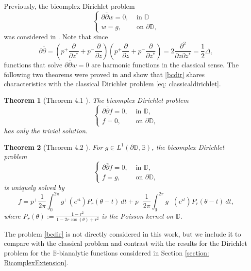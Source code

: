 \documentclass[12pt,reqno]{amsart}
\newtheorem{theorem}{Theorem}[section]
\theoremstyle{definition}
\theoremstyle{remark}
\newcommand{\p}{\partial}
\newcommand{\dbar}{\bar\partial}
\newcommand{\bc}{\mathbb{B}}
\newcommand{\disk}{\mathbb{D}}
\begin{document}
         Previously, the bicomplex Dirichlet problem 
         \begin{equation}\label{bcdir}\begin{cases}
                \p \dbar w = 0, & \text{ in }\disk\\
                w = g, & \text{ on } \p\disk,
         \end{cases}\end{equation}
         was considered in \cite{BCSchwarz}. Note that since 
         \[
            \p \dbar = \left(p^+ \frac{\p}{\p z^*} + p^- \frac{\p }{\p z} \right) \left(p^+ \frac{\p }{\p z} + p^- \frac{\p}{\p z^*}\right) = 2 \frac{\p^2}{\p z\p z^*} = \frac{1}{2}\Delta , 
         \]
         functions that solve $\p \dbar w = 0$ are harmonic functions in the classical sense. The following two theorems were proved in \cite{BCSchwarz} and show that \eqref{bcdir} shares characteristics with the classical Dirichlet problem \eqref{eq: classicaldirichlet}.
         
         \begin{theorem}[Theorem 4.1 \cite{BCSchwarz}]
             The bicomplex Dirichlet problem
            \[
                \begin{cases}
                  \p \dbar f = 0, &\text{ in } \disk,\\
                  f = 0, &\text{ on } \p\disk,
                \end{cases}
            \]
        has only the trivial solution.
        \end{theorem}

        \begin{theorem}[Theorem 4.2 \cite{BCSchwarz}]
            For $g \in L^1(\p \disk, \bc)$, the bicomplex Dirichlet problem
            \[
                \begin{cases}
                    \p \dbar f = 0, & \text{ in } \disk,\\
                    f = g, & \text{ on } \p\disk,
                \end{cases}
            \]
        is uniquely solved by 
        \[
            f = p^+ \frac{1}{2\pi} \int_0^{2\pi} g^+(e^{it})P_r(\theta - t) \,dt  + p^- \frac{1}{2\pi} \int_0^{2\pi} g^-(e^{it})P_r(\theta - t) \,dt,
        \]
        where $P_r(\theta) := \frac{1-r^2}{1-2r\cos(\theta) + r^2}$ is the Poisson kernel on $\disk$. 
        \end{theorem}
         
         The problem \eqref{bcdir} is not directly considered in this work, but we include it to compare with the classical problem and contrast with the results for the Dirichlet problem for the $\bc$-bianalytic functions considered in Section \ref{section: BicomplexExtension}.
\end{document}
